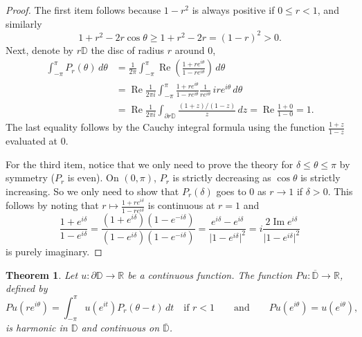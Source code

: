 \documentclass[12pt,openany]{book}
\renewcommand{\Re}{\operatorname{Re}}
\renewcommand{\Im}{\operatorname{Im}}
\newcommand{\sabs}[1]{\lvert {#1} \rvert}
\newcommand{\R}{{\mathbb{R}}}
\newcommand{\D}{{\mathbb{D}}}
\theoremstyle{plain}
\newtheorem{thm}{Theorem}[section]
\theoremstyle{remark}
\theoremstyle{definition}
\theoremstyle{exercise}
\theoremstyle{example}
\begin{document}
\begin{proof}
The first item follows because $1-r^2$ is always positive if $0 \leq r < 1$,
and similarly
\begin{equation*}
1+r^2-2r \cos\theta \geq 1+r^2-2r = {(1-r)}^2 > 0 .
\end{equation*}
Next, denote by $r\D$ the disc of radius $r$ around $0$,
\begin{equation*}
\begin{split}
\int_{-\pi}^{\pi}
P_r(\theta) \, d\theta
& =
\frac{1}{2\pi}
\int_{-\pi}^{\pi}
\Re
\left(
\frac{1+re^{i\theta}}{1-re^{i\theta}}
\right)
\, d\theta
\\
& =
\Re
\frac{1}{2\pi i}
\int_{-\pi}^{\pi}
\frac{1+re^{i\theta}}{1-re^{i\theta}} \frac{1}{re^{i\theta}} \,
ire^{i\theta}
\, d\theta
\\
& = 
\Re
\frac{1}{2\pi i}
\int_{\partial r\D}
\frac{(1+z)/(1-z)}{z} \, dz
=
\Re \frac{1+0}{1-0} = 1 .
\end{split}
\end{equation*}
The last equality follows by the Cauchy integral formula
using the function $\frac{1+z}{1-z}$ evaluated at $0$.

For the third item, notice that we only need to prove the
theory for $\delta \leq \theta \leq \pi$ by symmetry ($P_r$ is even).
On $(0,\pi)$, $P_r$ is strictly decreasing as $\cos \theta$ is strictly
increasing.  So we only need to show that $P_r(\delta)$ goes to $0$
as $r \to 1$ if $\delta > 0$.
This follows by noting that $r \mapsto
\frac{1+re^{i\delta}}{1-re^{i\delta}}$
is continuous at $r=1$ and
\begin{equation*}
\frac{1+e^{i\delta}}{1-e^{i\delta}}
=
\frac{(1+e^{i\delta})(1-e^{-i\delta})}{(1-e^{i\delta})(1-e^{-i\delta})}
=
\frac{e^{i\delta}-e^{i\delta}}{\sabs{1-e^{i\delta}}^2}
=
i \frac{2\Im e^{i\delta}}{\sabs{1-e^{i\delta}}^2}
\end{equation*}
is purely imaginary.
\end{proof}

\begin{thm} \label{thm:dirichsol}
Let $u \colon \partial \D \to \R$ be a continuous function.
The function
$Pu \colon \overline{\D} \to \R$, defined by
\begin{equation*}
Pu(re^{i\theta})
=
\int_{-\pi}^\pi u(e^{it}) P_r(\theta-t) \, dt
\quad \text{if $r < 1$} \qquad \text{and} \qquad
Pu(e^{i\theta}) = u(e^{i\theta}),
\end{equation*}
is harmonic in $\D$ and continuous on $\overline{\D}$.
\end{thm}
\end{document}
